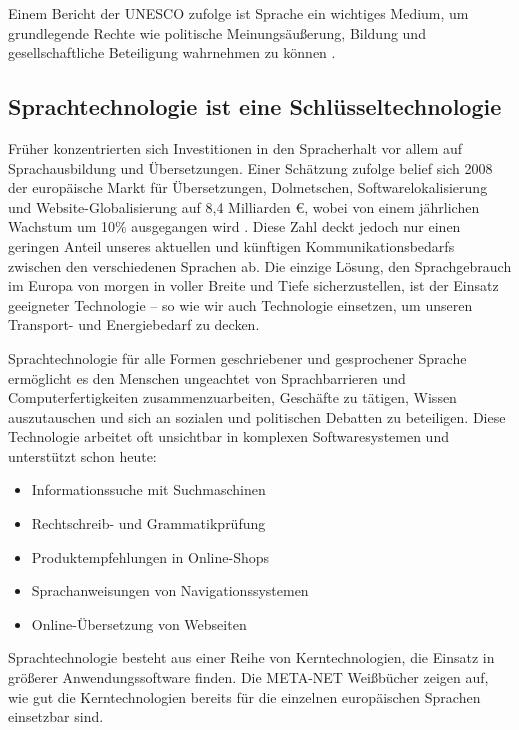 \documentclass[]{../../metanetpaper}
\begin{document}
\begin{multicols}{2}

Einem Bericht der UNESCO zufolge ist Sprache ein wichtiges Medium, um grundlegende Rechte wie politische Meinungsäußerung, Bildung und gesellschaftliche Beteiligung wahrnehmen zu können \cite{Unesco1}.

\subsection{Sprachtechnologie ist eine Schlüsseltechnologie}

Früher konzentrierten sich Investitionen in den Spracherhalt vor allem auf Sprachausbildung und Übersetzungen. Einer Schätzung zufolge belief sich 2008 der europäische Markt für Übersetzungen, Dolmetschen, Softwarelokalisierung und Website-Globalisierung auf 8,4 Milliarden €, wobei von einem jährlichen Wachstum um 10\% ausgegangen wird \cite{EC3}. Diese Zahl deckt jedoch nur einen geringen Anteil unseres aktuellen und künftigen Kommunikationsbedarfs zwischen den verschiedenen Sprachen ab. Die einzige Lösung, den Sprachgebrauch im Europa von morgen in voller Breite und  Tiefe sicherzustellen, ist der Einsatz geeigneter Tech\-no\-lo\-gie -- so wie wir auch Technologie einsetzen, um  unseren Transport- und Energiebedarf zu decken.

Sprachtechnologie für alle Formen geschriebener und gesprochener Sprache ermöglicht es den Menschen ungeachtet von Sprachbarrieren und Computerfertigkeiten zusammenzuarbeiten, Geschäfte zu tätigen, Wissen auszutauschen und sich an sozialen und politischen Debatten zu beteiligen. Diese Technologie arbeitet oft unsichtbar in komplexen Softwaresystemen und unterstützt schon heute:

\begin{itemize}
\item Informationssuche mit Suchmaschinen
\item Rechtschreib- und Grammatikprüfung
\item Produktempfehlungen in Online-Shops
\item Sprachanweisungen von Na\-vi\-ga\-tions\-sys\-te\-men
\item Online-Übersetzung von Webseiten 
\end{itemize}

Sprachtechnologie besteht aus einer Reihe von Kerntechnologien, die Einsatz in größerer Anwendungssoftware finden. Die META-NET Weißbücher zeigen auf, wie gut die Kerntechnologien bereits für die einzelnen europäischen Sprachen einsetzbar sind. 


\end{multicols}
\end{document}
